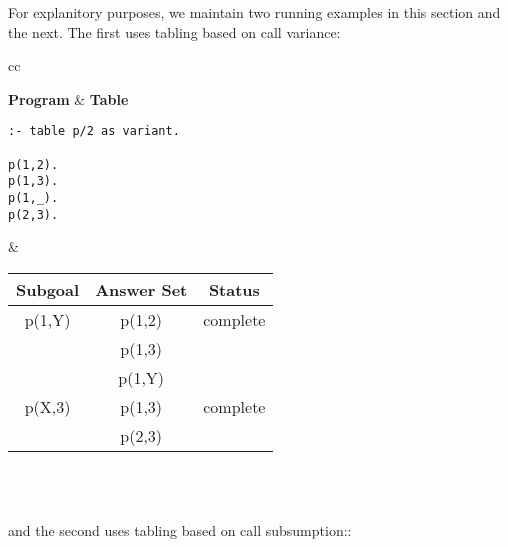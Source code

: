 For explanitory purposes, we maintain two running examples in this
section and the next.  The first uses tabling based on call variance:
%
\begin{center}
\begin{tabular}{cc}\hline \hline
{} \\ \hline \hline
\rule[-2ex]{0ex}{5ex} \textbf{Program} & \textbf{Table} \\
\begin{minipage}{14.5em}
\begin{verbatim}
:- table p/2 as variant.

p(1,2).
p(1,3).
p(1,_).
p(2,3).
\end{verbatim}
\end{minipage}
&
\begin{tabular}{|c|c|c|} \hline
  Subgoal & Answer Set & Status\\ \hline \hline
  p(1,Y) & p(1,2) & complete \\ 
         & p(1,3) & \\
         & p(1,Y) & \\ \hline
  p(X,3) & p(1,3) & complete \\ 
         & p(2,3) & \\ \hline
\end{tabular} \\
\vspace*{-2ex} \\ \hline \hline
\end{tabular}
\end{center}

\noindent
and the second uses tabling based on call subsumption::

